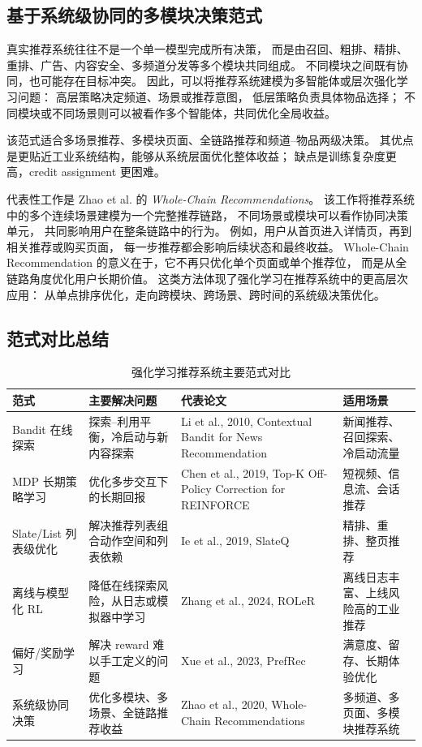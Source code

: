 \documentclass[11pt]{ctexart}
\begin{document}
\subsection{基于系统级协同的多模块决策范式}

真实推荐系统往往不是一个单一模型完成所有决策，
而是由召回、粗排、精排、重排、广告、内容安全、多频道分发等多个模块共同组成。
不同模块之间既有协同，也可能存在目标冲突。
因此，可以将推荐系统建模为多智能体或层次强化学习问题：
高层策略决定频道、场景或推荐意图，
低层策略负责具体物品选择；
不同模块或不同场景则可以被看作多个智能体，共同优化全局收益。

该范式适合多场景推荐、多模块页面、全链路推荐和频道--物品两级决策。
其优点是更贴近工业系统结构，能够从系统层面优化整体收益；
缺点是训练复杂度更高，credit assignment 更困难。

代表性工作是 Zhao et al. 的
\textit{Whole-Chain Recommendations}。
该工作将推荐系统中的多个连续场景建模为一个完整推荐链路，
不同场景或模块可以看作协同决策单元，
共同影响用户在整条链路中的行为。
例如，用户从首页进入详情页，再到相关推荐或购买页面，
每一步推荐都会影响后续状态和最终收益。
Whole-Chain Recommendation 的意义在于，它不再只优化单个页面或单个推荐位，
而是从全链路角度优化用户长期价值。
这类方法体现了强化学习在推荐系统中的更高层次应用：
从单点排序优化，走向跨模块、跨场景、跨时间的系统级决策优化。

\subsection{范式对比总结}

\begin{table}[htbp]
\centering
\small
\caption{强化学习推荐系统主要范式对比}
\begin{tabular}{p{2.6cm}p{3.3cm}p{3.3cm}p{3.5cm}}
\hline
范式 & 主要解决问题 & 代表论文 & 适用场景 \\
\hline
Bandit 在线探索 &
探索--利用平衡，冷启动与新内容探索 &
Li et al., 2010, Contextual Bandit for News Recommendation &
新闻推荐、召回探索、冷启动流量 \\
\hline
MDP 长期策略学习 &
优化多步交互下的长期回报 &
Chen et al., 2019, Top-K Off-Policy Correction for REINFORCE &
短视频、信息流、会话推荐 \\
\hline
Slate/List 列表级优化 &
解决推荐列表组合动作空间和列表依赖 &
Ie et al., 2019, SlateQ &
精排、重排、整页推荐 \\
\hline
离线与模型化 RL &
降低在线探索风险，从日志或模拟器中学习 &
Zhang et al., 2024, ROLeR &
离线日志丰富、上线风险高的工业推荐 \\
\hline
偏好/奖励学习 &
解决 reward 难以手工定义的问题 &
Xue et al., 2023, PrefRec &
满意度、留存、长期体验优化 \\
\hline
系统级协同决策 &
优化多模块、多场景、全链路推荐收益 &
Zhao et al., 2020, Whole-Chain Recommendations &
多频道、多页面、多模块推荐系统 \\
\hline
\end{tabular}
\end{table}
\end{document}
